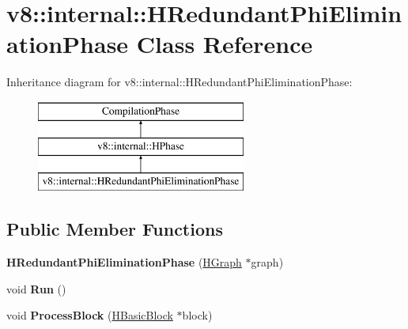 \hypertarget{classv8_1_1internal_1_1_h_redundant_phi_elimination_phase}{}\section{v8\+:\+:internal\+:\+:H\+Redundant\+Phi\+Elimination\+Phase Class Reference}
\label{classv8_1_1internal_1_1_h_redundant_phi_elimination_phase}
Inheritance diagram for v8\+:\+:internal\+:\+:H\+Redundant\+Phi\+Elimination\+Phase\+:\begin{figure}[H]
\begin{center}
\leavevmode
\includegraphics[height=3.000000cm]{classv8_1_1internal_1_1_h_redundant_phi_elimination_phase}
\end{center}
\end{figure}
\subsection*{Public Member Functions}
\begin{DoxyCompactItemize}
\item 
{\bfseries H\+Redundant\+Phi\+Elimination\+Phase} (\hyperlink{classv8_1_1internal_1_1_h_graph}{H\+Graph} $\ast$graph)\hypertarget{classv8_1_1internal_1_1_h_redundant_phi_elimination_phase_a945ae76c5666e27fc0e5fe93390a49c3}{}\label{classv8_1_1internal_1_1_h_redundant_phi_elimination_phase_a945ae76c5666e27fc0e5fe93390a49c3}

\item 
void {\bfseries Run} ()\hypertarget{classv8_1_1internal_1_1_h_redundant_phi_elimination_phase_a2192fc7bbf79aa3a97c4f07c472c85fa}{}\label{classv8_1_1internal_1_1_h_redundant_phi_elimination_phase_a2192fc7bbf79aa3a97c4f07c472c85fa}

\item 
void {\bfseries Process\+Block} (\hyperlink{classv8_1_1internal_1_1_h_basic_block}{H\+Basic\+Block} $\ast$block)\hypertarget{classv8_1_1internal_1_1_h_redundant_phi_elimination_phase_a84e9bfcc9c7e075b8e90a5178ee7e765}{}\label{classv8_1_1internal_1_1_h_redundant_phi_elimination_phase_a84e9bfcc9c7e075b8e90a5178ee7e765}

\end{DoxyCompactItemize}
